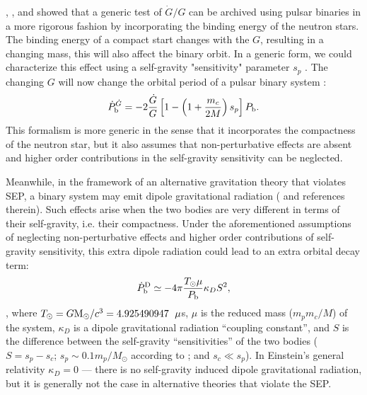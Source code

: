 \citet{nor90}, \citet{lwj+09}, and \citet{fwe+12} showed that a generic test of $\dot{G}/G$ can be archived using pulsar
binaries in a more rigorous fashion by incorporating the binding energy of the neutron stars.
The binding energy of a compact start changes with the $G$, resulting in a changing mass, this will also affect the binary orbit.
In a generic form, we could characterize this effect using a self-gravity "sensitivity" parameter $s_p$ \citep{Will93}.
The changing $G$ will now change the orbital period of a pulsar binary system \citep{nor90, lwj+09}:
\begin{equation}
\dot{P}_{\rm b}^{\dot{G}} = -2 \frac{\dot{G}}{G}
\left[1-\left( 1+\frac{m_c}{2M}\right) s_p\right]P_{\rm b}.
\end{equation}
This formalism is more generic in the sense that it incorporates the compactness of the neutron star, 
but it also assumes that non-perturbative effects are absent 
and higher order contributions in the self-gravity sensitivity can be neglected.

Meanwhile, in the framework of an alternative gravitation theory that violates
SEP, a binary system may emit dipole gravitational radiation (\citealt{Will93, Will01, lwj+09, fwe+12} and references
therein). Such effects arise when the two bodies are very different in terms
of their self-gravity, i.e.  their compactness.
Under the aforementioned assumptions of neglecting non-perturbative effects and higher order contributions of self-gravity sensitivity,
this extra dipole radiation could lead to an extra orbital decay term:
\begin{equation}
\dot{P}_{\rm b}^{\rm D} \simeq -4\pi\frac{T_{\odot}\mu}{P_{\rm b}}\kappa_D S^2,
\end{equation}
\citep{Will93,lwj+09}, where $T_{\odot}=G{\rm M_{\odot}}/c^3=4.925490947$~${\rm
\mu}$s, $\mu$ is the reduced mass ($m_pm_c/M$) of the system,
$\kappa_D$ is a dipole
gravitational radiation ``coupling constant'', and $S$ is the difference
between the self-gravity ``sensitivities'' of the two bodies ($S = s_p - s_c$;
$s_p\sim0.1m_p/M_{\odot}$ according to \citealt{de92} ; and $s_c\ll s_p$).
In Einstein's general relativity $\kappa_D=0$ --- there is no self-gravity induced
dipole gravitational radiation, but it is generally not the case in alternative
theories that violate the SEP.

